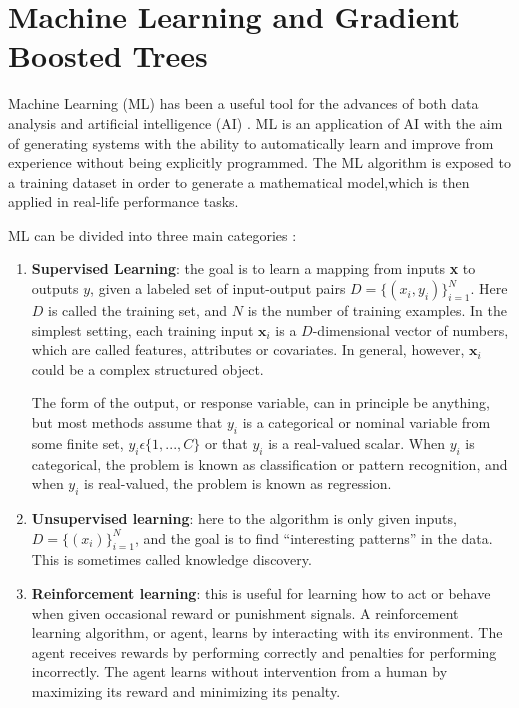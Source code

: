 \documentclass[a4paper, oneside]{book}
\begin{document}
		
		
	\chapter{Machine Learning and Gradient Boosted Trees}
		Machine Learning (ML) has been a useful tool for the advances of both data analysis and artificial intelligence (AI) \cite{Lifelong ML}. ML is an application of AI with the aim of generating systems with the ability to automatically learn and improve from experience without being explicitly programmed. The ML algorithm is exposed to a training dataset in order to generate a mathematical model,which is then applied in real-life performance tasks. %
		
		ML can be divided into three main categories \cite{ML categories}:
		\begin{enumerate}
			\item \textbf{Supervised Learning}: the goal is to learn a mapping from inputs \textbf{x} to outputs $y$, given a labeled set of input-output pairs $D = \{(x_i, y_i)\}_{i=1}^{N}$. Here $D$ is called the training set, and $N$ is the number of training examples. In the simplest setting, each training input $\textbf{x}_i$ is a $D$-dimensional vector of numbers, which are called features, attributes or covariates. In general, however, $\textbf{x}_i$ could be a complex structured object.
			
			The form of the output, or response variable, can in principle be anything, but most methods assume that $y_i$ is a categorical or nominal variable from some finite set, $y_i \epsilon  \{1, . . . , C\}$ or that $y_i$ is a real-valued scalar. When $y_i$ is categorical, the problem is known as classification or pattern recognition, and when $y_i$ is real-valued, the problem is known as regression.
			
			\item \textbf{Unsupervised learning}: here to the algorithm is only given inputs, $D = \{(x_i)\}_{i=1}^{N}$, and the goal is to find “interesting patterns” in the data. This is sometimes called knowledge discovery. %
			
			\item \textbf{Reinforcement learning}: this is useful for learning how to act or behave when given occasional reward or punishment signals. A reinforcement learning algorithm, or agent, learns by interacting with its environment. The agent receives rewards by performing correctly and penalties for performing incorrectly. The agent learns without intervention from a human by maximizing its reward and minimizing its penalty.
			
		\end{enumerate}
\end{document}
